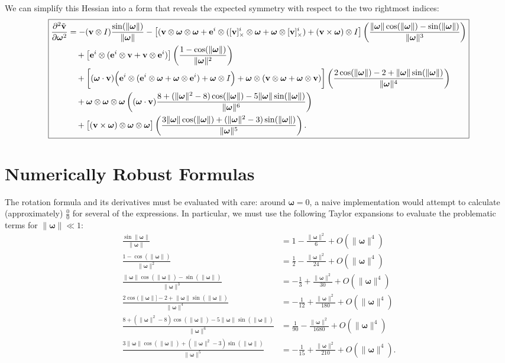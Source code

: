 \documentclass[10pt]{article}
\providecommand{\norm}[1]{\lVert#1\rVert}
\providecommand{\cross}{\times}
\renewcommand{\vec}[1]{{\bf #1}}
\def\w{\boldsymbol{\omega}}
\def\wn{\norm{\w}}
\def\v{\vec{v}}
\def\e{\vec{e}}
\begin{document}
We can simplify this Hessian into a form that reveals the expected symmetry with respect to the two rightmost indices:
\begin{equation*}
\boxed{
\begin{aligned}
\frac{\partial^2 \tilde{\v}}{\partial \w^2}
&=
    -(\v \otimes I)  \frac{\sin(\wn)}{\wn}
    - \big[(\v \otimes \w \otimes \w + \e^i \otimes ([\v]_\cross^i \otimes \w + \w \otimes [\v]_\cross^i) + (\v \cross \w) \otimes I \big] \left(\frac{\wn \cos(\wn) - \sin(\wn)}{\wn^3}\right)
\\ &\quad
    + \big[ \e^i \otimes (\e^i \otimes \v +  \v \otimes \e^i) \big] \left(\frac{1 - \cos(\wn)}{\wn^2}\right)
\\ &\quad
    + \bigg[ (\w \cdot \v) \Big(\e^i \otimes (\e^i \otimes \w + \w \otimes \e^i) + \w \otimes I\Big) + \w \otimes (\v \otimes \w + \w \otimes \v) \bigg] \left(\frac{2 \cos(\wn) - 2 + \wn \sin(\wn)}{\wn^4}\right)
\\ &\quad
    + \w \otimes \w \otimes \w \left((\w \cdot \v) \frac{8 + (\wn^2 - 8) \cos(\wn) - 5 \wn \sin(\wn)}{\wn^6}\right)
\\ &\quad
    + \big[(\v \cross \w) \otimes \w \otimes \w\big]\left(\frac{3 \wn \cos(\wn) + (\wn^2 - 3) \sin(\wn)}{\wn^5}\right).
\end{aligned}
}
\end{equation*}

\clearpage
\section{Numerically Robust Formulas}
The rotation formula and its derivatives must be evaluated with care: around $\w = 0$, a naive implementation would
attempt to calculate (approximately) $\frac{0}{0}$ for several of the expressions. In particular, we must use the following
Taylor expansions to evaluate the problematic terms for $\wn \ll 1$:
\begin{align*}
\frac{\sin{\wn}}{\wn}                                    &= 1 - \frac{\wn^2}{6} + O(\wn^4) \\
\frac{1 - \cos(\wn)}{\wn^2}                              &= \frac{1}{2} - \frac{\wn^2}{24} + O(\wn^4) \\
\frac{\wn \cos(\wn) - \sin(\wn)}{\wn^3}                  &= -\frac{1}{3} + \frac{\wn^2}{30} + O(\wn^4) \\
\frac{2 \cos(\wn] - 2 + \wn \sin(\wn)}{\wn^4}            &= -\frac{1}{12} + \frac{\wn^2}{180} + O(\wn^4) \\
\frac{8 + (\wn^2 - 8)\cos(\wn) - 5 \wn \sin(\wn)}{\wn^6} &= \frac{1}{90} - \frac{\wn^2}{1680} + O(\wn^4) \\
\frac{3 \wn \cos(\wn) + (\wn^2 - 3) \sin(\wn)}{\wn^5}    &= -\frac{1}{15} + \frac{\wn^2}{210} + O(\wn^4).
\end{align*}
\end{document}
